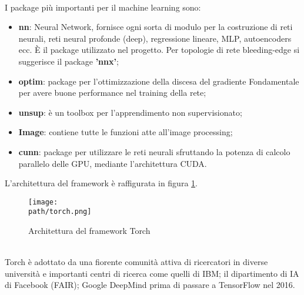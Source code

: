 \\
I package più importanti per il machine learning sono: 
\begin{itemize}
\item \textbf{nn}: Neural Network, fornisce ogni sorta di modulo per la costruzione di reti neurali, reti neural profonde (deep), regressione lineare, MLP, autoencoders ecc. È il package utilizzato nel progetto. Per topologie di rete bleeding-edge si suggerisce il package \textbf{'nnx'}; 
\item  \textbf{optim}: package per l'ottimizzazione della discesa del gradiente  Fondamentale per avere buone performance nel training della rete; 
\item \textbf{unsup}: è un toolbox per l'apprendimento non supervisionato; 

\item \textbf{Image}: contiene tutte le funzioni atte all'image processing; 

\item \textbf{cunn}: package per utilizzare le reti neurali sfruttando la potenza di calcolo parallelo delle GPU, mediante l'architettura CUDA. 
\end{itemize}
L'architettura del framework è raffigurata in figura \ref{fig:torch}.\\

\begin{figure}[h!]
 \centering
 \texttt{[image: \\path/torch.png]} 
 \caption{Architettura del framework Torch}
 \label{fig:torch}
\end{figure}
\\
Torch è adottato da una fiorente comunità attiva di ricercatori in diverse università e importanti centri di ricerca come quelli di IBM; il dipartimento di IA di Facebook (FAIR); Google DeepMind prima di passare a TensorFlow nel 2016.


